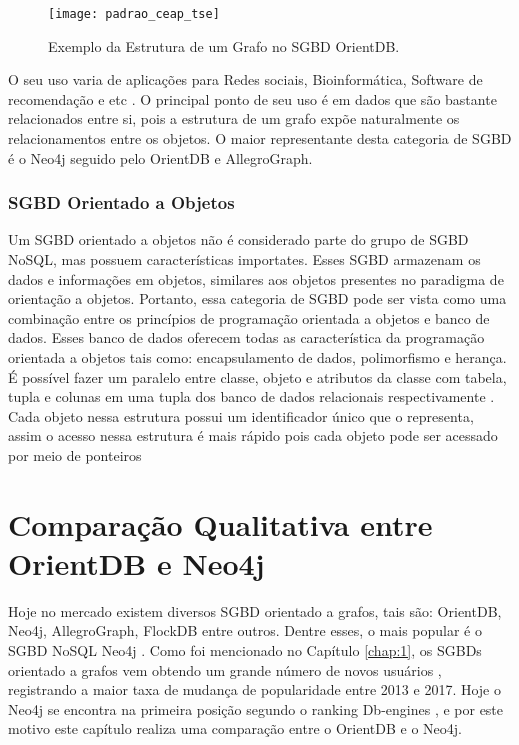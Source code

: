 \begin{figure}[h]
	\centering
    \texttt{[image: padrao\_ceap\_tse]}
    \caption{Exemplo da Estrutura de um Grafo no SGBD OrientDB.}
    \label{fig:graph_orientdb}
\end{figure}
	
	O seu uso varia de aplicações para Redes sociais, Bioinformática, Software de recomendação e etc \cite{nayak2013type}. O principal ponto de seu uso é em dados que são bastante relacionados entre si, pois a estrutura de um grafo expõe naturalmente os relacionamentos entre os objetos. O maior representante desta categoria de SGBD é o Neo4j seguido pelo OrientDB e AllegroGraph.
	
\subsubsection{SGBD Orientado a Objetos}
	Um SGBD orientado a objetos não é considerado parte do grupo de SGBD NoSQL, mas possuem características importates. Esses SGBD armazenam os dados e informações em objetos, similares aos objetos presentes no paradigma de orientação a objetos. Portanto, essa categoria de SGBD pode ser vista como uma combinação entre os princípios de programação orientada a objetos e banco de dados. Esses banco de dados oferecem todas as característica da programação orientada a objetos tais como: encapsulamento de dados, polimorfismo e herança. É possível fazer um paralelo entre classe, objeto e atributos da classe com tabela, tupla e colunas em uma tupla dos banco de dados relacionais respectivamente \cite{nayak2013type}. Cada objeto nessa estrutura possui um identificador único que o representa, assim o acesso nessa estrutura é mais rápido pois cada objeto pode ser acessado por meio de ponteiros

\section{Comparação Qualitativa entre OrientDB e Neo4j} \label{comparison_graph_nosql}

	Hoje no mercado existem diversos SGBD orientado a grafos, tais são: OrientDB, Neo4j, AllegroGraph, FlockDB entre outros. Dentre esses, o mais popular é o SGBD NoSQL Neo4j \cite{neo4j-site}. Como foi mencionado no Capítulo \ref{chap:1}, os SGBDs orientado a grafos vem obtendo um grande número de novos usuários \cite{Dbmspopularity}, registrando a maior taxa de mudança de popularidade entre 2013 e 2017. Hoje o Neo4j se encontra na primeira posição segundo o ranking Db-engines \cite{neo4jprimeiro}, e por este motivo este capítulo realiza uma comparação entre o OrientDB e o Neo4j.
	
